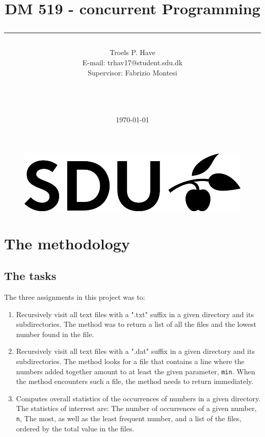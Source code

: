 \documentclass[11pt]{article}
\title{DM 519 - concurrent Programming \\\rule{10cm}{0.5mm}}
\author{Troels P. Have \\E-mail: trhav17@student.sdu.dk \\Supervisor: Fabrizio Montesi\\\rule{5.5cm}{0.5mm}\\}
\date{\today}
\begin{document}
\setlength{\baselineskip}{1\baselineskip} %

\maketitle
\begin{figure} [H] \centering
\includegraphics[scale=0.5]{SDUlogo.png}
\end{figure}
 \newpage

\tableofcontents


\section{The methodology}
\subsection{The tasks}
The three assignments in this project was to:
\begin{enumerate}
\item Recursively visit all text files with a ".txt" suffix in a given directory and its subdirectories. The method was to return a list of all the files and the lowest number found in the file.

\item Recursively visit all text files with a ".dat" suffix in a given directory and its subdirectories. The method looks for a file that contains a line where the numbers added together amount to at least the given parameter, \texttt{min}. When the method encounters such a file, the method needs to return immediately.

\item Computes overall statistics of the occurrences of numbers in a given directory. The statistics of interrest are: The number of occurrences of a given number, \texttt{n}, The most, as well as the least frequent number, and a list of the files, ordered by the total value in the files.

\end{enumerate}
\end{document}
